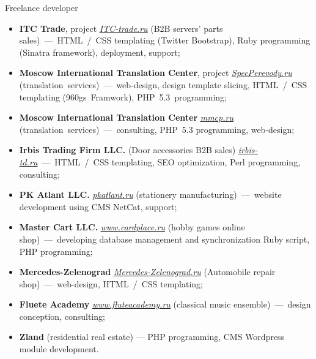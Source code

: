 \documentclass[12pt,a4paper,final]{moderncv}
\begin{document}
{Freelance developer}{}{}{}{
\begin{itemize}
  \item \textbf{ITC Trade}, project \underline{\href{http://itc-trade.ru}{\itshape ITC-trade.ru}} (B2B servers' parts sales)~---~HTML~/~CSS templating (Twitter Bootstrap), Ruby programming (Sinatra framework), deployment, support;
  \item \textbf{Moscow International Translation Center}, project \underline{\href{http://specperevody.ru}{\itshape SpecPerevody.ru}} (translation~services)~---~web-design, design template slicing, HTML~/~CSS templating (960gs~Framwork), PHP~5.3~programming;
  \item \textbf{Moscow International Translation Center} \underline{\href{http://mmcp.ru}{\itshape mmcp.ru}} (translation~services)~---~consulting, PHP~5.3 programming, web-design;
  \item \textbf{Irbis Trading Firm LLC.} (Door accessories B2B sales) \underline{\href{http://irbis-td.ru}{\itshape irbis-td.ru}}~---~HTML~/~CSS templating, SEO optimization, Perl programming, consulting;
  \item \textbf{PK Atlant LLC.} \underline{\href{http://pkatlant.ru}{\itshape pkatlant.ru}} (stationery manufacturing)~---~website development using CMS NetCat, support;
  \item \textbf{Master Cart LLC.} \underline{\href{http://www.cardplace.ru}{\itshape www.cardplace.ru}} (hobby games online shop)~---~developing database management and synchronization Ruby script, PHP programming;
  \item \textbf{Mercedes-Zelenograd} \underline{\href{http://mercedes-zelenograd.ru}{\itshape Mercedes-Zelenograd.ru}} (Automobile repair shop)~---~web-design, HTML~/~CSS templating;
  \item \textbf{Fluete Academy} \underline{\href{http://www.fluteacademy.ru}{\itshape www.fluteacademy.ru}} (classical music ensemble)~---~design conception, consulting;
  \item \textbf{Zland} (residential real estate) --- PHP programming, CMS Wordpress module development.
\end{itemize}}
\end{document}
